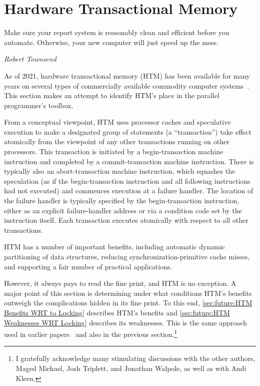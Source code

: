 
\section{Hardware Transactional Memory}
\label{sec:future:Hardware Transactional Memory}
%
\epigraph{Make sure your report system is reasonably clean and efficient
	  before you automate.
	  Otherwise, your new computer will just speed up the mess.}
	 {\emph{Robert Townsend}}

As of 2021, hardware transactional memory (HTM) has been available for many
years on several types of commercially available commodity computer
systems~\cite{Yoo:2013:PEI:2503210.2503232,RickMerrit2011PowerTM,ChristianJacobi2012MainframeTM,TimothyHayes2020ARM-HTM}.
This section makes an attempt to identify HTM's place in the parallel
programmer's toolbox.

From a conceptual viewpoint, HTM uses processor caches and speculative
execution to make a designated group of statements (a ``transaction'')
take effect atomically
from the viewpoint of any other transactions running on other processors.
This transaction is initiated by a
begin-transaction machine instruction and completed by a commit-transaction
machine instruction.
There is typically also an abort-transaction machine instruction, which
squashes the speculation (as if the begin-transaction instruction and
all following instructions had not executed) and commences execution
at a failure handler.
The location of the failure handler is typically specified by the
begin-transaction instruction, either as an explicit failure-handler
address or via a condition code set by the instruction itself.
Each transaction executes atomically with respect to all other transactions.

HTM has a number of important benefits, including automatic
dynamic partitioning of data structures, reducing synchronization-primitive
cache misses, and supporting a fair number of practical applications.

However, it always pays to read the fine print, and HTM is no exception.
A major point of this section is determining under what conditions HTM's
benefits outweigh the complications hidden in its fine print.
To this end, \cref{sec:future:HTM Benefits WRT to Locking}
describes HTM's benefits and
\cref{sec:future:HTM Weaknesses WRT Locking} describes its weaknesses.
This is the same approach used in earlier
papers~\cite{McKenney2007PLOSTM,PaulEMcKenney2010OSRGrassGreener}
and also in the previous section.\footnote{
	I gratefully acknowledge many stimulating
	discussions with the other authors, Maged Michael, Josh Triplett,
	and Jonathan Walpole, as well as with Andi Kleen.}

